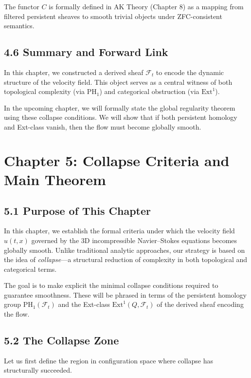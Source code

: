 \documentclass[11pt]{article}
\begin{document}
The functor \( C \) is formally defined in AK Theory (Chapter 8) as a mapping from filtered persistent sheaves to smooth trivial objects under ZFC-consistent semantics.

\subsection{4.6 Summary and Forward Link}

In this chapter, we constructed a derived sheaf \( \mathcal{F}_t \) to encode the dynamic structure of the velocity field.  
This object serves as a central witness of both topological complexity (via \( \mathrm{PH}_1 \)) and categorical obstruction (via \( \mathrm{Ext}^1 \)).

In the upcoming chapter, we will formally state the global regularity theorem using these collapse conditions.  
We will show that if both persistent homology and Ext-class vanish, then the flow must become globally smooth.



\section{Chapter 5: Collapse Criteria and Main Theorem}

\subsection{5.1 Purpose of This Chapter}

In this chapter, we establish the formal criteria under which the velocity field \( u(t,x) \) governed by the 3D incompressible Navier–Stokes equations becomes globally smooth.  
Unlike traditional analytic approaches, our strategy is based on the idea of \emph{collapse}—a structural reduction of complexity in both topological and categorical terms.

The goal is to make explicit the minimal collapse conditions required to guarantee smoothness.  
These will be phrased in terms of the persistent homology group \( \mathrm{PH}_1(\mathcal{F}_t) \) and the Ext-class \( \mathrm{Ext}^1(Q, \mathcal{F}_t) \) of the derived sheaf encoding the flow.

\subsection{5.2 The Collapse Zone}

Let us first define the region in configuration space where collapse has structurally succeeded.
\end{document}
